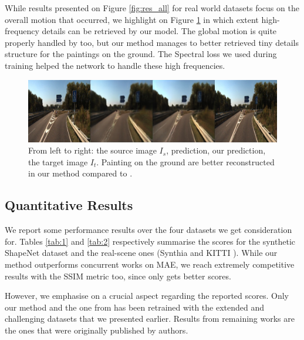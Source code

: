 While results presented on Figure \ref{fig:res_all} for real world datasets focus on the overall motion that occurred, we highlight on Figure \ref{fig:res_all2} in which extent high-frequency details can be retrieved by our model. The global motion is quite properly handled by \citep{kim2020novel} too, but our method manages to better retrieved tiny details structure for the paintings on the ground. The Spectral loss we used during training helped the network to handle these high frequencies. 
\begin{figure}[h!]
    \begin{center}
    \includegraphics[width=.8\textwidth]{images/epipolarnvs/rebbutal_KITTI_3.jpg}
    \end{center}
     \caption{From left to right: the source image  $I_s$, \citep{kim2020novel} prediction, our prediction, the target image $I_t$. Painting on the ground are better reconstructed in our method compared to \citep{kim2020novel}.}
     \label{fig:res_all2}
\end{figure}

  
\subsection{Quantitative Results}

We report some performance results over the four datasets we get consideration for. Tables \ref{tab:1} and \ref{tab:2} respectively summarise the scores for the synthetic ShapeNet \citep{chang2015shapenet} dataset and the real-scene ones (Synthia \citep{ros2016synthia} and KITTI \citep{geiger2012we}). While our method outperforms concurrent works on MAE, we reach extremely competitive results with the SSIM metric too, since only \citep{sun2018multiview} gets better scores. \newline

However, we emphasise on a crucial aspect regarding the reported scores. Only our method and the one from \citep{kim2020novel} has been retrained with the extended and challenging datasets that we presented earlier. Results from remaining works \citep{tatarchenko2015single,zhou2016view,park2017transformation,sun2018multiview,} are the ones that were originally published by authors. 

